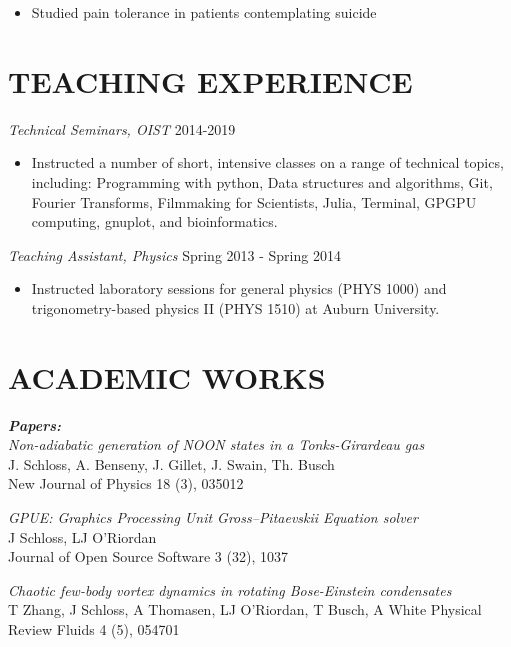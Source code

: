 \documentclass[margin, 10pt, a4paper]{res} %
\begin{document}
\begin{resume}
\begin{itemize} [label = {}]
\item Studied pain tolerance in patients contemplating suicide
\end{itemize} 


\section{TEACHING EXPERIENCE}

{\sl Technical Seminars, OIST} \hfill{2014-2019}
\begin{itemize}[label = {}]
\item Instructed a number of short, intensive classes on a range of technical topics, including: Programming with python, Data structures and algorithms, Git, Fourier Transforms, Filmmaking for Scientists, Julia, Terminal, GPGPU computing, gnuplot, and bioinformatics.
\end{itemize}

{\sl Teaching Assistant, Physics} \hfill Spring 2013 - Spring 2014 
\begin{itemize}[label = {}]
\item Instructed laboratory sessions for general physics (PHYS 1000) and trigonometry-based physics II (PHYS 1510) at Auburn University.
\end{itemize} 

\section{ACADEMIC WORKS}

{\sl \textbf{Papers:} } \\
 \textit{Non-adiabatic generation of NOON states in a Tonks-Girardeau gas} \\
  J. Schloss, A. Benseny, J. Gillet, J. Swain, Th. Busch \\
  New Journal of Physics 18 (3), 035012
  
  \textit{GPUE: Graphics Processing Unit Gross--Pitaevskii Equation solver} \\
  J Schloss, LJ O'Riordan \\
  Journal of Open Source Software 3 (32), 1037
  
  \textit{Chaotic few-body vortex dynamics in rotating Bose-Einstein condensates} \\
  T Zhang, J Schloss, A Thomasen, LJ O'Riordan, T Busch, A White
  Physical Review Fluids 4 (5), 054701
 

\end{resume}
\end{document}
